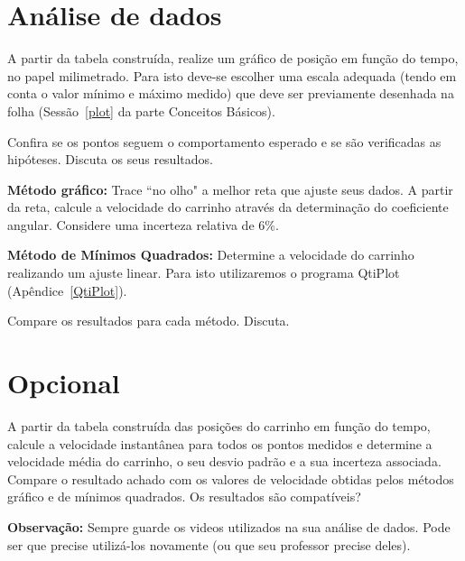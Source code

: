 \begin{num}

\end{num}

\vspace{-1.4cm}
\section*{Análise de dados}

\begin{num}
\item A partir da tabela construída, realize um gráfico de posição em função do tempo, no papel milimetrado. Para isto deve-se escolher uma escala adequada (tendo em conta o valor mínimo e máximo medido) que deve ser previamente desenhada na folha (Sessão~\ref{plot} da parte Conceitos Básicos). 
\item Confira se os pontos seguem o comportamento esperado e se são verificadas as hipóteses. Discuta os seus resultados.
\item {\bf Método gráfico:} Trace ``no olho" a melhor reta que ajuste seus dados.  A partir da reta, calcule a velocidade do carrinho através da determinação do coeficiente angular. Considere uma incerteza relativa de 6\%.
\item {\bf Método de Mínimos Quadrados:} Determine a velocidade do carrinho realizando um ajuste linear. Para isto utilizaremos o programa QtiPlot (Apêndice~\ref{QtiPlot}).
\item Compare os resultados para cada método. Discuta.
\end{num}

\vspace{-0.7cm}
\section*{Opcional} 

A partir da tabela construída das posições do carrinho em função do tempo, calcule a velocidade instantânea para todos os pontos medidos e determine a velocidade média do carrinho, o seu desvio padrão e a sua incerteza associada. Compare o resultado achado com os valores de velocidade obtidas pelos métodos gráfico e de mínimos quadrados. Os resultados são compatíveis?

{\bf Observação:} Sempre guarde os videos utilizados na sua análise de dados.  Pode ser que precise utilizá-los novamente (ou que seu professor precise deles). 

